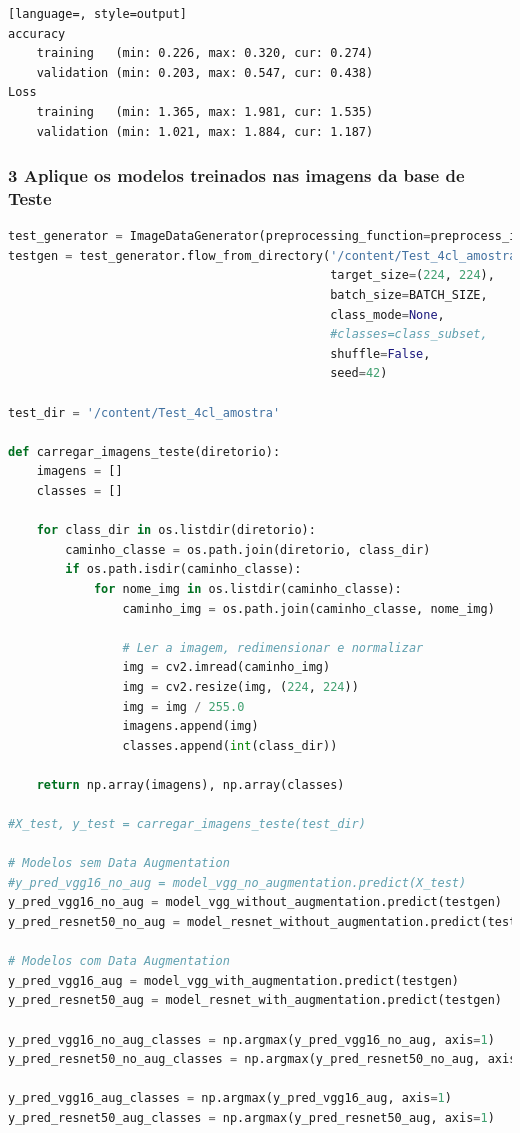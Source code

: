 \begin{lstlisting}[language=, style=output]
accuracy
	training   (min: 0.226, max: 0.320, cur: 0.274)
	validation (min: 0.203, max: 0.547, cur: 0.438)
Loss
	training   (min: 1.365, max: 1.981, cur: 1.535)
	validation (min: 1.021, max: 1.884, cur: 1.187)
\end{lstlisting}


\subsubsection*{3 Aplique os modelos treinados nas imagens da base de Teste}

\begin{lstlisting}[language=Python, style=input]
test_generator = ImageDataGenerator(preprocessing_function=preprocess_input, rescale=1.0/255.0)
testgen = test_generator.flow_from_directory('/content/Test_4cl_amostra',
                                             target_size=(224, 224),
                                             batch_size=BATCH_SIZE,
                                             class_mode=None,
                                             #classes=class_subset,
                                             shuffle=False,
                                             seed=42)

test_dir = '/content/Test_4cl_amostra'

def carregar_imagens_teste(diretorio):
    imagens = []
    classes = []

    for class_dir in os.listdir(diretorio):
        caminho_classe = os.path.join(diretorio, class_dir)
        if os.path.isdir(caminho_classe):
            for nome_img in os.listdir(caminho_classe):
                caminho_img = os.path.join(caminho_classe, nome_img)

                # Ler a imagem, redimensionar e normalizar
                img = cv2.imread(caminho_img)
                img = cv2.resize(img, (224, 224))
                img = img / 255.0
                imagens.append(img)
                classes.append(int(class_dir))

    return np.array(imagens), np.array(classes)

#X_test, y_test = carregar_imagens_teste(test_dir)

# Modelos sem Data Augmentation
#y_pred_vgg16_no_aug = model_vgg_no_augmentation.predict(X_test)
y_pred_vgg16_no_aug = model_vgg_without_augmentation.predict(testgen)
y_pred_resnet50_no_aug = model_resnet_without_augmentation.predict(testgen)

# Modelos com Data Augmentation
y_pred_vgg16_aug = model_vgg_with_augmentation.predict(testgen)
y_pred_resnet50_aug = model_resnet_with_augmentation.predict(testgen)

y_pred_vgg16_no_aug_classes = np.argmax(y_pred_vgg16_no_aug, axis=1)
y_pred_resnet50_no_aug_classes = np.argmax(y_pred_resnet50_no_aug, axis=1)

y_pred_vgg16_aug_classes = np.argmax(y_pred_vgg16_aug, axis=1)
y_pred_resnet50_aug_classes = np.argmax(y_pred_resnet50_aug, axis=1)
\end{lstlisting}


